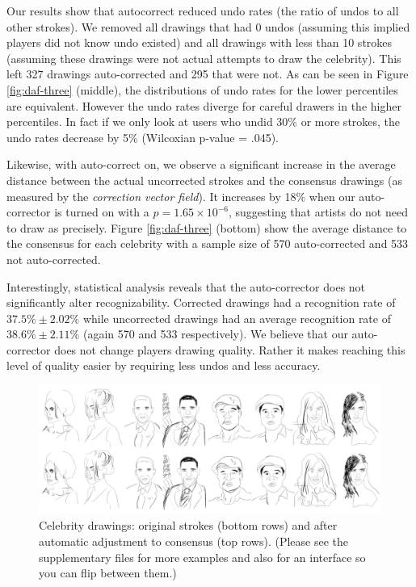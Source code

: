 
Our results show that autocorrect reduced undo rates (the ratio of undos to all other strokes). We removed all drawings that had 0 undos (assuming this implied players did not know undo existed) and all drawings with less than 10 strokes (assuming these drawings were not actual attempts to draw the celebrity). This left 327 drawings auto-corrected and 295 that were not.  As can be seen in Figure \ref{fig:daf-three} (middle), the distributions of undo rates for the lower percentiles are equivalent. However the undo rates diverge for careful drawers in the higher percentiles. In fact if we only look at users who undid 30\% or more strokes, the undo rates decrease by 5\% (Wilcoxian p-value = .045). 

Likewise, with auto-correct on,  we observe a significant increase in the average distance between the actual uncorrected strokes and the consensus drawings (as measured by the \emph{correction vector field}). It increases by 18\% when our auto-corrector is turned on with a $p=1.65\times10^{-6}$, suggesting that artists do not need to draw as precisely. Figure \ref{fig:daf-three} (bottom) show the average distance to the consensus for each celebrity with a sample size of 570 auto-corrected and 533 not auto-corrected.

Interestingly, statistical analysis reveals that the auto-corrector does not significantly alter recognizability. Corrected drawings had a recognition rate of $37.5\% \pm 2.02\%$ while uncorrected drawings had an average recognition rate of $38.6\% \pm 2.11\%$ (again 570 and 533 respectively). We believe that our auto-corrector does not change players drawing quality. Rather it makes reaching this level of quality easier by requiring less undos and less accuracy.



\begin{figure}[!t]
  \centering%
\includegraphics[width=7in]{./figures/ResultsAll_16.pdf}
\vspace{-0.35in}
  \caption{Celebrity drawings: original strokes (bottom rows) and after automatic adjustment to consensus (top rows). (Please see the supplementary files for more examples and also for an interface so you can flip between them.)}
\vspace{-0.25in}
  \label{fig:results}
\end{figure}
